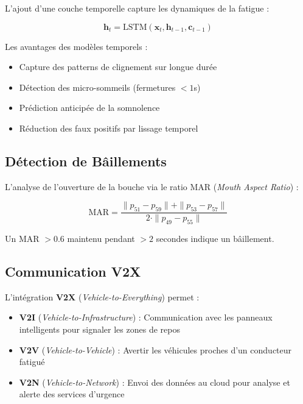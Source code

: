 \documentclass[12pt,a4paper,twoside]{report}
\newcommand{\keyword}[1]{\textbf{\textcolor{stellantisblue}{#1}}}
\begin{document}
L'ajout d'une couche temporelle capture les dynamiques de la fatigue :

\begin{equation}
\mathbf{h}_t = \text{LSTM}(\mathbf{x}_t, \mathbf{h}_{t-1}, \mathbf{c}_{t-1})
\label{eq:lstm}
\end{equation}

Les avantages des modèles temporels :
\begin{itemize}
    \item Capture des patterns de clignement sur longue durée
    \item Détection des micro-sommeils (fermetures $< 1$s)
    \item Prédiction anticipée de la somnolence
    \item Réduction des faux positifs par lissage temporel
\end{itemize}

\subsection{Détection de Bâillements}

L'analyse de l'ouverture de la bouche via le ratio MAR (\textit{Mouth Aspect Ratio}) :

\begin{equation}
\text{MAR} = \frac{\|p_{51} - p_{59}\| + \|p_{53} - p_{57}\|}{2 \cdot \|p_{49} - p_{55}\|}
\label{eq:mar}
\end{equation}

Un MAR $> 0.6$ maintenu pendant $> 2$ secondes indique un bâillement.

\subsection{Communication V2X}

L'intégration \keyword{V2X} (\textit{Vehicle-to-Everything}) permet :
\begin{itemize}
    \item \textbf{V2I} (\textit{Vehicle-to-Infrastructure}) : Communication avec les panneaux intelligents pour signaler les zones de repos
    \item \textbf{V2V} (\textit{Vehicle-to-Vehicle}) : Avertir les véhicules proches d'un conducteur fatigué
    \item \textbf{V2N} (\textit{Vehicle-to-Network}) : Envoi des données au cloud pour analyse et alerte des services d'urgence
\end{itemize}
\end{document}
